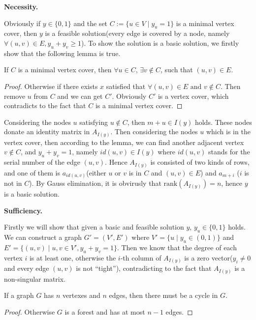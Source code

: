 \par\noindent\textbf{Necessity.}\par
Obviously if $y \in \{0, 1\}$ and the set $C := \{u \in V \mid y_u = 1\}$ is a minimal vertex cover, then $y$ is a feasible solution(every edge is covered by a node, namely $\forall (u, v) \in E, y_u + y_v \geq 1$). To show the solution is a basic solution, we firstly show that the following lemma is true.
\begin{lemma}
    If $C$ is a minimal vertex cover, then $\forall u \in C$, $\exists v \notin C$, such that $(u, v) \in E$.
\end{lemma}
\begin{proof}
    Otherwise if there exists $x$ satisfied that $\forall (u, v) \in E\text{~and~}v \notin C$. Then remove $u$ from $C$ and we can get $C'$. Obviously $C'$ is a vertex cover, which contradicts to the fact that $C$ is a minimal vertex cover.
\end{proof}
\noindent Considering the nodes $u$ satisfying $u \notin C$, then $m + u \in I(y)$ holds. These nodes donate an identity matrix in $A_{I(y)}$. Then considering the nodes $u$ which is in the vertex cover, then according to the lemma, we can find another adjacent vertex $v \notin C$, and $y_u + y_v = 1$, namely $id(u, v) \in I(y)$ where $id(u, v)$ stands for the serial number of the edge $(u, v)$. Hence $A_{I(y)}$ is consisted of two kinds of rows, and one of them is $a_{id(u, v)}$(either $u$ or $v$ is in $C$ and $(u, v) \in E$) and $a_{m+i}$ ($i$ is not in $C$). By Gauss elimination, it is obvirusly that $\mathrm{rank}\left(A_{I(y)}\right) = n$, hence $y$ is a basic solution.
\par\noindent\textbf{Sufficiency.}\par
Firstly we will show that given a basic and feasible solution $y$, $y_u \in \{0, 1\}$ holds. We can construct a graph $G' = (V', E')$ where $V' = \{u\mid y_u \in (0, 1)\}$ and $E' = \{(u, v) \mid u, v \in V', y_u + y_v = 1\}$. Then we know that the degree of each vertex $i$ is at least one, otherwise the $i$-th column of $A_{I(y)}$ is a zero vector($y_i \neq 0$ and every edge $(u, v)$ is not ``tight''), contradicting to the fact that $A_{I(y)}$ is a non-singular matrix.
\begin{lemma}
    If a graph $G$ has $n$ vertexes and $n$ edges, then there must be a cycle in $G$.
\end{lemma}
\begin{proof}
    Otherwise $G$ is a forest and has at most $n - 1$ edges.
\end{proof}
